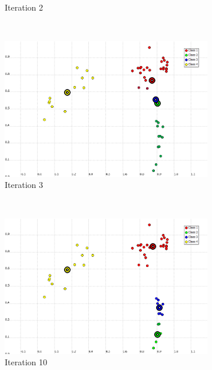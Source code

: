 \documentclass[a4paper,10pt]{article}
\begin{document}
\begin{figure}[H]
\begin{subfigure}[t]{0.2\textwidth}
      \caption{Iteration 2}
      \label{fig:K-Means-4K-beta-30-it2}
     \end{subfigure}
      ~
    \begin{subfigure}[t]{0.2\textwidth}
      \centering
      \includegraphics[width=\textwidth]{pictures/K-Means-4K-beta-30-it3.png}
      \caption{Iteration 3}
      \label{fig:K-Means-4K-beta-30-it3}
     \end{subfigure}
      ~
    \begin{subfigure}[t]{0.2\textwidth}
      \centering
      \includegraphics[width=\textwidth]{pictures/K-Means-4K-beta-30-it10.png}
      \caption{Iteration 10}
      \label{fig:K-Means-4K-beta-30-it10}
     \end{subfigure}
     ~
     \begin{subfigure}[t]{0.2\textwidth}
      \centering

\end{subfigure}
\end{figure}
\end{document}
